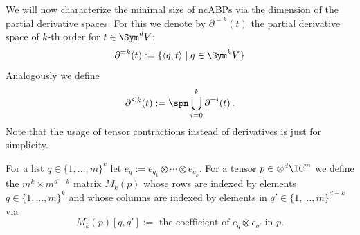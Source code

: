 We will now characterize the minimal size of ncABPs via the dimension of the partial derivative spaces.
For this we denote by $\partial^{=k}(t)$ the partial derivative space of $k$-th order for $t \in \Sym^d V$:
\[
    \partial^{=k}(t) := \{ \langle q, t \rangle \mid q \in \Sym^k V\}
\]
Analogously we define
\[
    \partial^{\leq k}(t) := \spn \bigcup_{i = 0}^k \partial^{=i}(t)\,.
\]
Note that the usage of tensor contractions instead of derivatives is just for simplicity.

For a list $q \in \{1,\ldots,m\}^k$ let $e_q := e_{q_1} \otimes \cdots \otimes e_{q_k}$.
For a tensor $p \in \otimes^d \IC^m$ we define the $m^k \times m^{d-k}$ matrix $M_k(p)$ whose rows are indexed by elements $q \in \{1,\ldots,m\}^k$ and whose columns are indexed by elements in $q' \in \{1,\ldots,m\}^{d-k}$ via
\begin{equation}\label{eq:Mk}
M_k(p)[q, q'] := \text{ the coefficient of $e_q \otimes e_{q'}$ in $p$}.
\end{equation}

